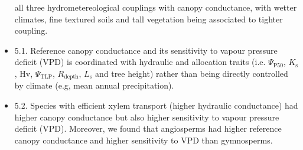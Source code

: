 \documentclass[11pt,twoside]{reedthesis}
\begin{document}
\begin{itemize}
  all three hydrometereological couplings with canopy conductance, with
  wetter climates, fine textured soils and tall vegetation being
  associated to tighter coupling.\par
\item
  5.1. Reference canopy conductance and its sensitivity to vapour
  pressure deficit (VPD) is coordinated with hydraulic and allocation
  traits (i.e. \(\Psi_{\text{P50}}\), \(K_{\text{s}}\), Hv,
  \(\Psi_{\text{TLP}}\), \(R_{\text{depth}}\), \(L_{\text{s}}\) and tree
  height) rather than being directly controlled by climate (e.g, mean
  annual precipitation).\par
\item
  5.2. Species with efficient xylem transport (higher hydraulic
  conductance) had higher canopy conductance but also higher sensitivity
  to vapour pressure deficit (VPD). Moreover, we found that angiosperms
  had higher reference canopy conductance and higher sensitivity to VPD
  than gymnosperms.\par
\end{itemize}
\appendix
\end{document}
